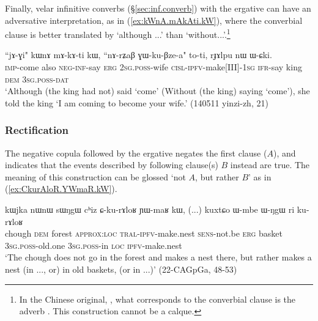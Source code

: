 Finally, velar infinitive converbs (§\ref{sec:inf.converb}) with the ergative can have an adversative interpretation,  as in (\ref{ex:kWnA.mAkAti.kW}), where the converbial clause is better translated by `although ...' than `without...'.\footnote{In the Chinese original, , what corresponds to the converbial clause is the adverb . This construction cannot be a calque.}

\begin{exe}
\ex \label{ex:kWnA.mAkAti.kW}
\gll  ``jɤ-ɣi" kɯnɤ mɤ-kɤ-ti kɯ, ``nɤ-rʑaβ ɣɯ-ku-βze-a" to-ti, rɟɤlpu nɯ ɯ-ɕki. \\
\textsc{imp}-come also \textsc{neg}-\textsc{inf}-say \textsc{erg} \textsc{2sg}.\textsc{poss}-wife \textsc{cisl}-\textsc{ipfv}-make[III]-\textsc{1sg} \textsc{ifr}-say king \textsc{dem} \textsc{3sg}.\textsc{poss}-\textsc{dat} \\
\glt `Although (the king had not) said `come' (Without (the king) saying `come'), she told the king `I am coming to become your wife.'  (140511 yinzi-zh, 21)
\end{exe}

\subsubsection{Rectification} \label{sec:rectification.clauses}
The negative copula  followed by the ergative  negates the first clause ($A$), and indicates that the events described by following clause(s) $B$ instead are true. The meaning of this construction can be glossed `not $A$, but rather $B$' as in (\ref{ex:CkurAloR.YWmaR.kW}). 

\begin{exe}
\ex \label{ex:CkurAloR.YWmaR.kW}
\gll  kɯjka nɯnɯ sɯŋgɯ cʰiz ɕ-ku-rɤloʁ ɲɯ-maʁ kɯ, (...) kuxtɕo ɯ-mbe ɯ-ŋgɯ ri ku-rɤloʁ \\
chough \textsc{dem} forest \textsc{approx}:\textsc{loc} \textsc{tral}-\textsc{ipfv}-make.nest \textsc{sens}-not.be \textsc{erg} { } basket \textsc{3sg}.\textsc{poss}-old.one \textsc{3sg}.\textsc{poss}-in \textsc{loc} \textsc{ipfv}-make.nest \\
\glt `The chough does not go in the forest and makes a nest there, but rather makes a nest (in ...,  or) in old baskets, (or in ...)' (22-CAGpGa, 48-53)
\end{exe} 


